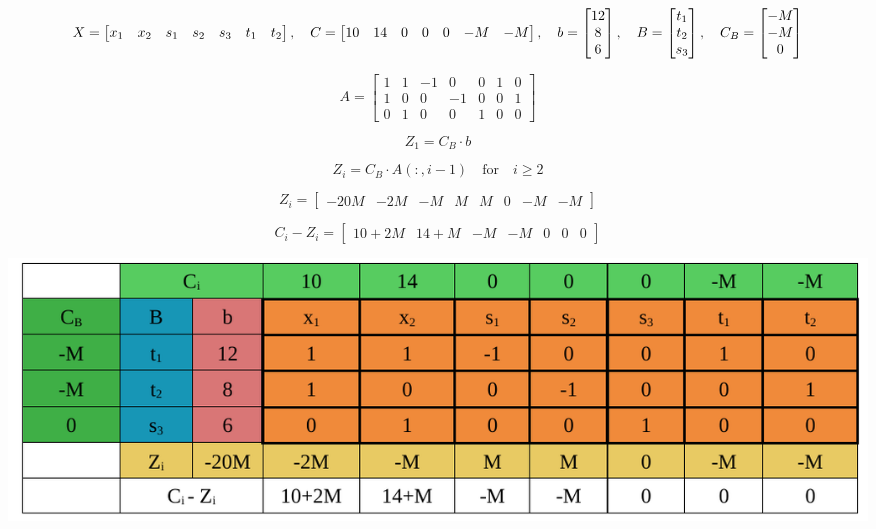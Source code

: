 \[
X = \left[\begin{matrix} x_1 & x_2 & s_1 & s_2 & s_3 & t_1 & t_2\end{matrix}\right], \hspace{0.35cm}
C = \left[\begin{matrix} 10 & 14 & 0 & 0 & 0 & -M & -M \end{matrix}\right], \hspace{0.35cm}
b = \left[\begin{matrix} 12 \\ 8 \\ 6 \end{matrix}\right], \hspace{0.35cm}
B = \left[\begin{matrix} t_1 \\ t_2 \\ s_3 \end{matrix}\right], \hspace{0.35cm}
C_B = \left[\begin{matrix} -M \\ -M \\ 0 \end{matrix}\right]
\]

\vspace{0.5cm}
\[
    A = \left[\begin{matrix}  1 & 1 & -1& 0 & 0 & 1 & 0\\
                              1 & 0 & 0 & -1& 0 & 0 & 1 \\
                              0 & 1 & 0 & 0 & 1 & 0 & 0\end{matrix}\right]
\]


\vspace{0.75cm}
\[Z_1 = C_B \cdot b\] 


\[Z_i = C_B \cdot A(:, i-1) \quad \text{for} \quad i \geq 2\] 

\[Z_i = \left[\begin{matrix} -20M & -2M & -M & M & M & 0 & -M & -M \end{matrix}\right]\]

\vspace{0.5cm}

\[C_i-Z_i = \left[\begin{matrix} 10 + 2M  & 14+M & -M  & -M  & 0 & 0 & 0  \end{matrix}\right]\]

\vspace{0.35cm}


\begin{center}
    \includegraphics{Chapters/Simplexe/EX/EX6/ex6.1.pdf}
\end{center}

